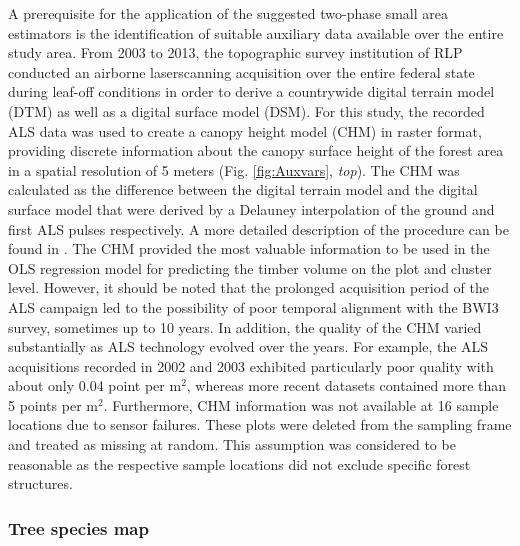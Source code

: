 \documentclass[remotesensing,article,submit,moreauthors,pdftex,10pt,a4paper]{mdpi}
\begin{document}
A prerequisite for the application of the suggested two-phase small area estimators is the identification of suitable auxiliary data available over the entire study area. From 2003 to 2013, the topographic survey institution of RLP conducted an airborne laserscanning acquisition over the entire federal state during leaf-off conditions in order to derive a countrywide digital terrain model (DTM) as well as a digital surface model (DSM). For this study, the recorded ALS data was used to create a canopy height model (CHM) in raster format, providing discrete information about the canopy surface height of the forest area in a spatial resolution of 5 meters (Fig. \ref{fig:Auxvars}, \textit{top}). The CHM was calculated as the difference between the digital terrain model and the digital surface model that were derived by a Delauney interpolation of the ground and first ALS pulses respectively. A more detailed description of the procedure can be found in \citet{hill2017a}. The CHM provided the most valuable information to be used in the OLS regression model for predicting the timber volume on the plot and cluster level. However, it should be noted that the prolonged acquisition period of the ALS campaign led to the possibility of poor temporal alignment with the BWI3 survey, sometimes up to 10 years. In addition, the quality of the CHM varied substantially as ALS technology evolved over the years.  For example, the ALS acquisitions recorded in 2002 and 2003 exhibited particularly poor quality with about only 0.04 point per m$^2$, whereas more recent datasets contained more than 5 points per m$^2$. Furthermore, CHM information was not available at 16 sample locations due to sensor failures. These plots were deleted from the sampling frame and treated as missing at random. This assumption was considered to be reasonable as the respective sample locations did not exclude specific forest structures.

\subsubsection{Tree species map}
\label{sec:tspecclass}
\end{document}
